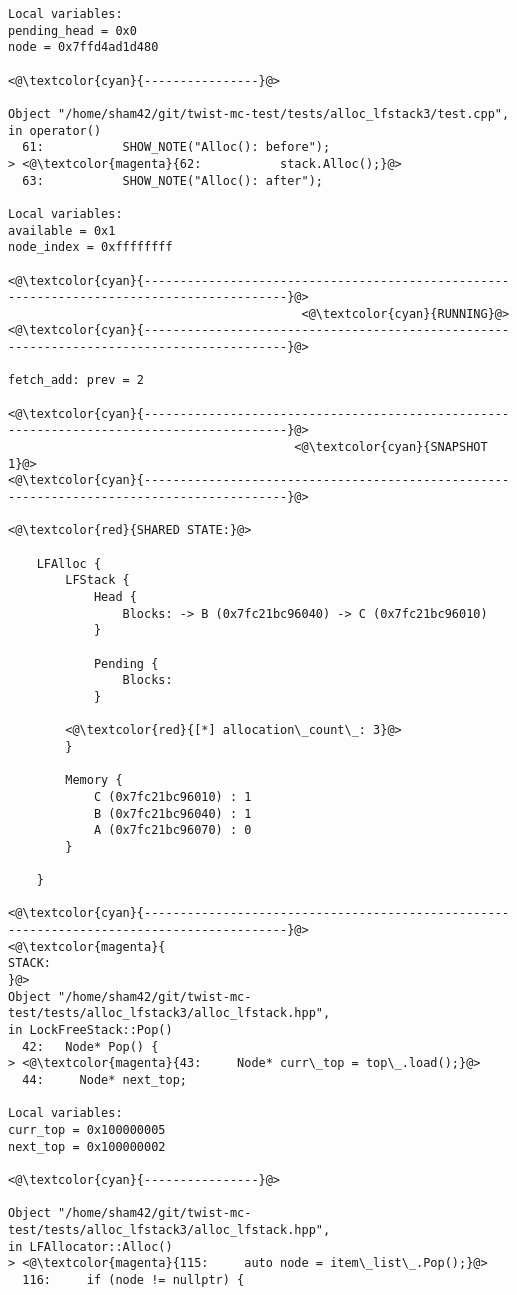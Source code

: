 \begin{adjustwidth}{-3.3cm}{-1cm}
\begin{allintypewriter}
\begin{multicols*}{2}
\begin{lstlisting}[numbers=none]
Local variables: 
pending_head = 0x0
node = 0x7ffd4ad1d480

<@\textcolor{cyan}{----------------}@>

Object "/home/sham42/git/twist-mc-test/tests/alloc_lfstack3/test.cpp",
in operator()
  61:           SHOW_NOTE("Alloc(): before");
> <@\textcolor{magenta}{62:           stack.Alloc();}@>
  63:           SHOW_NOTE("Alloc(): after");

Local variables: 
available = 0x1
node_index = 0xffffffff

<@\textcolor{cyan}{------------------------------------------------------------------------------------------}@>
                                         <@\textcolor{cyan}{RUNNING}@>
<@\textcolor{cyan}{------------------------------------------------------------------------------------------}@>

fetch_add: prev = 2

<@\textcolor{cyan}{------------------------------------------------------------------------------------------}@>
                                        <@\textcolor{cyan}{SNAPSHOT 1}@>
<@\textcolor{cyan}{------------------------------------------------------------------------------------------}@>

<@\textcolor{red}{SHARED STATE:}@>

    LFAlloc {
	    LFStack {
		    Head {
			    Blocks: -> B (0x7fc21bc96040) -> C (0x7fc21bc96010) 
		    }

		    Pending {
			    Blocks: 
		    }

		<@\textcolor{red}{[*] allocation\_count\_: 3}@>
	    }

	    Memory {
		    C (0x7fc21bc96010) : 1
		    B (0x7fc21bc96040) : 1
		    A (0x7fc21bc96070) : 0
	    }

    }

<@\textcolor{cyan}{------------------------------------------------------------------------------------------}@>
<@\textcolor{magenta}{
STACK:
}@>
Object "/home/sham42/git/twist-mc-test/tests/alloc_lfstack3/alloc_lfstack.hpp",
in LockFreeStack::Pop()
  42:   Node* Pop() {
> <@\textcolor{magenta}{43:     Node* curr\_top = top\_.load();}@>
  44:     Node* next_top;

Local variables: 
curr_top = 0x100000005
next_top = 0x100000002

<@\textcolor{cyan}{----------------}@>

Object "/home/sham42/git/twist-mc-test/tests/alloc_lfstack3/alloc_lfstack.hpp",
in LFAllocator::Alloc()
> <@\textcolor{magenta}{115:     auto node = item\_list\_.Pop();}@>
  116:     if (node != nullptr) {


\end{lstlisting}
\end{multicols*}
\end{allintypewriter}
\end{adjustwidth}
